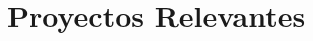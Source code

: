 \documentclass[a4paper]{article}
\begin{document}
    

\section{Proyectos Relevantes}
\end{document}

